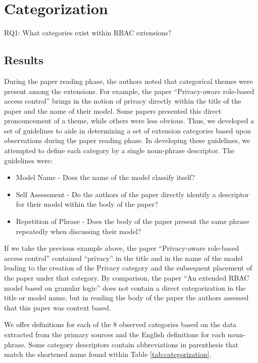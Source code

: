 \section{Categorization} \label{sec:categorization}

RQ1: What categories exist within RBAC extensions?

\subsection{Results}

During the paper reading phase, the authors noted that categorical themes were present among the extensions. 
For example, the paper ``Privacy-aware role-based access control'' \cite{ni2010privacy} brings in the notion of privacy directly within the title of the paper and the name of their model. 
Some papers presented this direct pronouncement of a theme, while others were less obvious. 
Thus, we developed a set of guidelines to aide in determining a set of extension categories based upon observations during the paper reading phase. 
In developing these guidelines, we attempted to define each category by a single noun-phrase descriptor.
The guidelines were:

\begin{itemize}
\item Model Name - Does the name of the model classify itself?
\item Self Assessment - Do the authors of the paper directly identify a descriptor for their model within the body of the paper?
\item Repetition of Phrase - Does the body of the paper present the same phrase repeatedly when discussing their model?
\end{itemize}

If we take the previous example above, the paper ``Privacy-aware role-based access control'' \cite{ni2010privacy} contained ``privacy'' in
the title and in the name of the model leading to the creation of the Privacy category and the subsequent placement of the paper under that category.
By comparison, the paper ``An extended RBAC model based on granular logic'' \cite{jian2008extended} does not contain a direct categorization in the title or model name, but in reading the body of the paper the authors assessed that this paper was context based.  

We offer definitions for each of the 8 observed categories based on the data extracted from the primary sources and the English definitions for each noun-phrase. 
Some category descriptors contain abbreviations in parenthesis that match the shortened name found within Table \ref{tab:categorization}.

